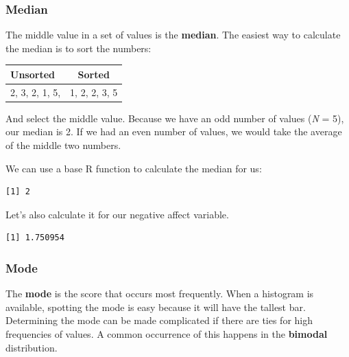 \documentclass[
  11pt,
]{book}
\newenvironment{Shaded}{\begin{snugshade}}{\end{snugshade}}
\newcommand{\AttributeTok}[1]{\textcolor[rgb]{0.77,0.63,0.00}{#1}}
\newcommand{\ConstantTok}[1]{\textcolor[rgb]{0.00,0.00,0.00}{#1}}
\newcommand{\FunctionTok}[1]{\textcolor[rgb]{0.00,0.00,0.00}{#1}}
\newcommand{\NormalTok}[1]{#1}
\newcommand{\SpecialCharTok}[1]{\textcolor[rgb]{0.00,0.00,0.00}{#1}}
\begin{document}
\hypertarget{median}{%
\subsubsection{Median}\label{median}}

The middle value in a set of values is the \textbf{median}. The easiest way to calculate the median is to sort the numbers:

\begin{longtable}[]{@{}lc@{}}
\toprule()
Unsorted & Sorted \\
\midrule()
\endhead
2, 3, 2, 1, 5, & 1, 2, 2, 3, 5 \\
\bottomrule()
\end{longtable}

And select the middle value. Because we have an odd number of values (\emph{N} = 5), our median is 2. If we had an even number of values, we would take the average of the middle two numbers.

We can use a base R function to calculate the median for us:

\begin{Shaded}
\end{Shaded}

\begin{verbatim}
[1] 2
\end{verbatim}

Let's also calculate it for our negative affect variable.

\begin{Shaded}
\end{Shaded}

\begin{verbatim}
[1] 1.750954
\end{verbatim}

\hypertarget{mode}{%
\subsubsection{Mode}\label{mode}}

The \textbf{mode} is the score that occurs most frequently. When a histogram is available, spotting the mode is easy because it will have the tallest bar. Determining the mode can be made complicated if there are ties for high frequencies of values. A common occurrence of this happens in the \textbf{bimodal} distribution.
\end{document}
